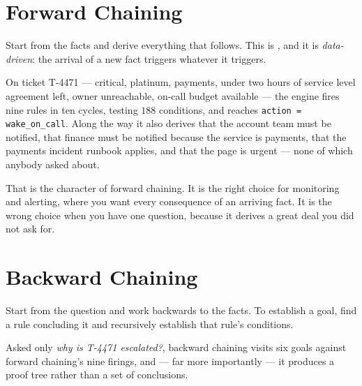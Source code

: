 \section{Forward Chaining}

Start from the facts and derive everything that follows. This is
, and it is \emph{data-driven}: the arrival of a new fact
triggers whatever it triggers.

On ticket T-4471 --- critical, platinum, payments, under two hours of service level
agreement left, owner unreachable, on-call budget available --- the engine fires
nine rules in ten cycles, testing $188$ conditions, and reaches
\texttt{action = wake\_on\_call}. Along the way it also derives that the account
team must be notified, that finance must be notified because the service is
payments, that the payments incident runbook applies, and that the page is urgent
--- none of which anybody asked about.

That is the character of forward chaining. It is the right choice for monitoring
and alerting, where you want every consequence of an arriving fact. It is the wrong
choice when you have one question, because it derives a great deal you did not ask
for.

\section{Backward Chaining}

Start from the question and work backwards to the facts. To establish a goal, find a
rule concluding it and recursively establish that rule's conditions.

Asked only \emph{why is T-4471 escalated?}, backward chaining visits six goals
against forward chaining's nine firings, and --- far more importantly --- it
produces a proof tree rather than a set of conclusions.

